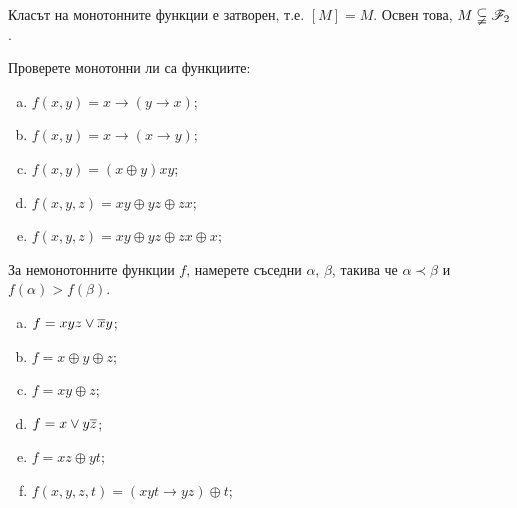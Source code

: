 \begin{prop}
  Класът на монотонните функции е затворен, т.е. $[M] = M$.
  Освен това, $M \subsetneqq \mathscr{F}_2$.
\end{prop}


\begin{problem}
  Проверете монотонни ли са функциите:
  \begin{enumerate}[a)]
  \item
    $f(x,y) = x\rightarrow (y\rightarrow x)$;
  \item
    $f(x,y) = x\rightarrow (x\rightarrow y)$;
  \item
    $f(x,y) = (x\oplus y)xy$;
  \item
    $f(x,y,z) = xy\oplus yz \oplus zx$;
  \item
    $f(x,y,z) = xy\oplus yz \oplus zx \oplus x$;
  \end{enumerate}
\end{problem}

\begin{problem}
  За немонотонните функции $f$, намерете съседни $\alpha$, $\beta$, такива че
  $\alpha \prec \beta$ и $f(\alpha) > f(\beta)$.
  \begin{enumerate}[a)]
  \item
    $f = xyz \vee \overline{x}y$;
  \item
    $f = x\oplus y\oplus z$;
  \item
    $f = xy\oplus z$;
  \item
    $f = x\vee y\overline{z}$;
  \item
    $f = xz\oplus yt$;
  \item
    $f(x,y,z,t) = (xyt\rightarrow yz)\oplus t$;
  \end{enumerate}
\end{problem}


